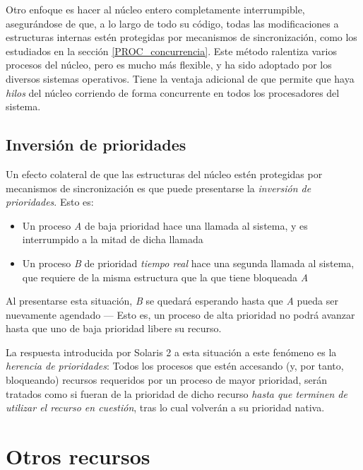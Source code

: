 \documentclass[11pt,fleqn]{book} %
\begin{document}
Otro enfoque es hacer al núcleo entero completamente interrumpible,
asegurándose de que, a lo largo de todo su código, todas las
modificaciones a estructuras internas estén protegidas por mecanismos
de sincronización, como los estudiados en la sección \ref{PROC_concurrencia}. Este
método ralentiza varios procesos del núcleo, pero es mucho más
flexible, y ha sido adoptado por los diversos sistemas
operativos. Tiene la ventaja adicional de que permite que haya \emph{hilos}
del núcleo corriendo de forma concurrente en todos los procesadores
del sistema.
\subsection{Inversión de prioridades}
\label{sec-4-5-3}


Un efecto colateral de que las estructuras del núcleo estén
protegidas por mecanismos de sincronización es que puede presentarse
la \emph{inversión de prioridades}. Esto es:

\begin{itemize}
\item Un proceso \emph{A} de baja prioridad hace una llamada al sistema, y es
  interrumpido a la mitad de dicha llamada
\item Un proceso \emph{B} de prioridad \emph{tiempo real} hace una segunda llamada
  al sistema, que requiere de la misma estructura que la que tiene
  bloqueada \emph{A}
\end{itemize}

Al presentarse esta situación, \emph{B} se quedará esperando hasta que \emph{A}
pueda ser nuevamente agendado — Esto es, un proceso de alta prioridad
no podrá avanzar hasta que uno de baja prioridad libere su recurso.

La respuesta introducida por Solaris 2 a esta situación a este
fenómeno es la \emph{herencia de prioridades}: Todos los procesos que estén
accesando (y, por tanto, bloqueando) recursos requeridos por un
proceso de mayor prioridad, serán tratados como si fueran de la
prioridad de dicho recurso \emph{hasta que terminen de utilizar el recurso en cuestión}, tras lo cual volverán a su prioridad nativa.
\section{Otros recursos}
\label{sec-4-6}
\end{document}

